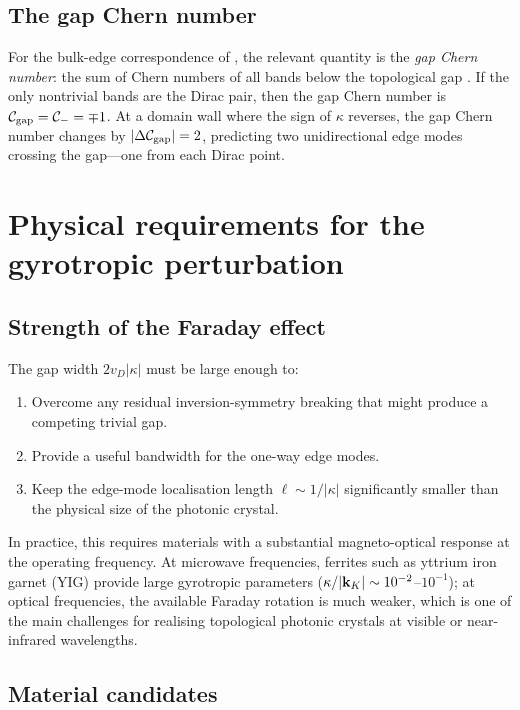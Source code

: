 \subsection{The gap Chern number}
\label{sec:ch7-gap-chern}

For the bulk-edge correspondence of
, the relevant quantity is the \emph{gap
Chern number}: the sum of Chern numbers of all bands below the
topological gap
\cite{haldane2008reflection,chen2023berry}.  If the only nontrivial bands are the Dirac pair,
then the gap Chern number is $\mathcal{C}_{\mathrm{gap}}=\mathcal{C}_-=\mp 1$.
At a domain wall where the sign of $\kappa$ reverses, the gap Chern
number changes by $|\Delta\mathcal{C}_{\mathrm{gap}}|=2$, predicting two
unidirectional edge modes crossing the gap---one from each Dirac point.

\section{Physical requirements for the gyrotropic perturbation}
\label{sec:ch7-physical}

\subsection{Strength of the Faraday effect}
\label{sec:ch7-strength}

The gap width $2v_D|\kappa|$ must be large enough to:
\begin{enumerate}
  \item Overcome any residual inversion-symmetry breaking that might
  produce a competing trivial gap.
  \item Provide a useful bandwidth for the one-way edge modes.
  \item Keep the edge-mode localisation length
  $\ell\sim 1/|\kappa|$ significantly smaller than the physical
  size of the photonic crystal.
\end{enumerate}
In practice, this requires materials with a substantial magneto-optical
response at the operating frequency.  At microwave frequencies, ferrites
such as yttrium iron garnet (YIG) provide large gyrotropic parameters
($\kappa/|\mathbf{k}_K|\sim 10^{-2}$--$10^{-1}$); at optical frequencies,
the available Faraday rotation is much weaker, which is one of the main
challenges for realising topological photonic crystals at visible or
near-infrared wavelengths.

\subsection{Material candidates}
\label{sec:ch7-materials}


